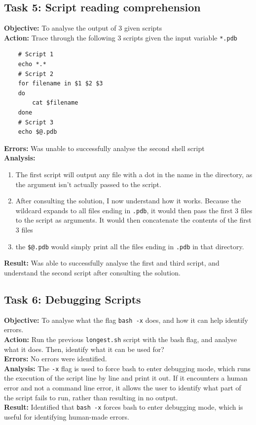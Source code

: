 \documentclass{article}
\begin{document}
\subsection{Task 5: Script reading comprehension}
%
\textbf{Objective:} To analyse the output of 3 given scripts\\
\textbf{Action:} Trace through the following 3 scripts given the input variable \verb|*.pdb|
\begin{verbatim}
    # Script 1
    echo *.*
    # Script 2
    for filename in $1 $2 $3
    do
        cat $filename
    done
    # Script 3
    echo $@.pdb
\end{verbatim}
\textbf{Errors:} Was unable to successfully analyse the second shell script\\
\textbf{Analysis:}
\begin{enumerate}
    \item The first script will output any file with a dot in the name in the directory, as the argument isn't actually passed to the script.
    \item After consulting the solution, I now understand how it works. Because the wildcard expands to all files ending in \verb|.pdb|, it would then pass the first 3 files to the script as arguments. It would then concatenate the contents of the first 3 files
    \item the \verb|$@.pdb| would simply print all the files ending in \verb|.pdb| in that directory.
\end{enumerate}
\textbf{Result:} Was able to successfully analyse the first and third script, and understand the second script after consulting the solution.
\subsection{Task 6: Debugging Scripts}
\textbf{Objective:} To analyse what the flag \verb|bash -x| does, and how it can help identify errors.\\
\textbf{Action:} Run the previous \verb|longest.sh| script with the bash flag, and analyse what it does. Then, identify what it can be used for?\\
\textbf{Errors:} No errors were identified.\\
\textbf{Analysis:} The \texttt{-x} flag is used to force bash to enter debugging mode, which runs the execution of the script line by line and print it out. If it encounters a human error and not a command line error, it allows the user to identify what part of the script fails to run, rather than resulting in no output.\\
\textbf{Result:} Identified that \verb|bash -x| forces bash to enter debugging mode, which is useful for identifying human-made errors.
\end{document}
